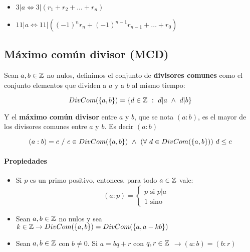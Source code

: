 \begin{itemize}
    \item $3|a \iff 3|(r_1 + r_2 + \dots + r_n)$
    \item $11|a \iff 11|((-1)^{n}r_n + (-1)^{n-1}r_{n-1}+\dots + r_0)$
\end{itemize}

\subsection{Máximo común divisor (MCD)}
Sean $a,b\in\mathbb{Z}$ no nulos, definimos el conjunto de \textbf{divisores comunes} como el conjunto elementos que dividen a $a$ y a $b$ al mismo tiempo:

$$DivCom(\{a,b\}) = \{d\in\mathbb{Z} ~:~d|a~\land~d|b\}$$

Y el \textbf{máximo común divisor} entre $a$ y $b$, que se nota $(a:b)$, es el mayor de los divisores comunes entre $a$ y $b$. Es decir $(a:b)$

$$(a:b) = c~/~ c\in DivCom(\{a,b\}) ~\land~(\forall~d\in DivCom(\{a,b\}))~d\leq c$$

\paragraph{Propiedades}
\begin{itemize}
\item Si $p$ es un primo positivo, entonces, para todo $a\in\mathbb{Z}$ vale:
\begin{equation*}
    (a:p) = \left\{
        \begin{array}{l}
        p \text{ si } p|a \\
        1 \text{ sino}
        \end{array}
    \right.
\end{equation*}
\item Sean $a,b\in\mathbb{Z}$ no nulos y sea $k\in\mathbb{Z}\to DivCom(\{a,b\}) = DivCom(\{a,a - kb\})$
\item Sean $a,b\in\mathbb{Z}$ con $b\neq0$. Si $a=bq + r$ con $q,r\in\mathbb{Z}$ $\to (a:b) = (b:r)$
\end{itemize}

